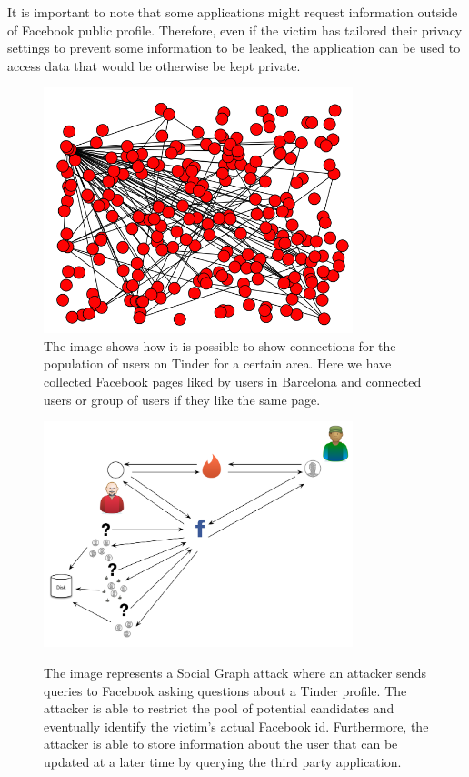 It is important to note that some applications might request information outside of Facebook public profile. Therefore, even if the victim has tailored their privacy settings to prevent some information to be leaked, the application can be used to access data that would be otherwise be kept private.

\begin{figure}[t]
\centering
\includegraphics[width=90mm]{figures/figure_connections.png}
\caption[Facebook pages likes by Tinder users.]{The image shows how it is possible to show connections for the population of users on Tinder for a certain area. Here we have collected Facebook pages liked by users in Barcelona and connected users or group of users if they like the same page.}\label{fig:connections}
\end{figure}

\begin{figure}[tb!]
\centering\hspace*{\fill}
{\includegraphics[width=90mm]{figures/attack_scenario.png}%
\label{graph}}\hspace*{\fill}
\caption[Social Graph attack]{The image represents a Social Graph attack where an attacker sends queries to Facebook asking questions about a Tinder profile. The attacker is able to restrict the pool of potential candidates and eventually identify the victim's actual Facebook id. Furthermore, the attacker is able to store information about the user that can be updated at a later time by querying the third party application.}
\label{fig:fgs}
\end{figure}

